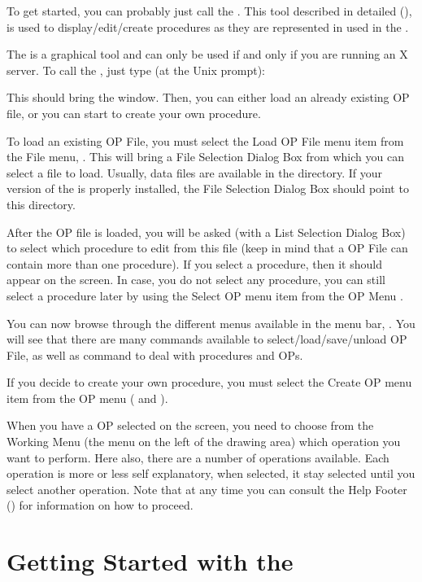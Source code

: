 To get started, you can probably just call the \OPE{}. This tool described in
detailed (), is used to display/edit/create
procedures as they are represented in used in the \COPRSDE{}.

The \OPE{} is a graphical tool and can only be used if and only if you are
running an X server. To call the \OPE{}, just type (at the Unix prompt):


This should bring the \OPE{} window. Then, you can either load an already
existing OP file, or you can start to create your own procedure.

To load an existing OP File, you must select the Load OP File menu item
from the File menu, . This will bring a File Selection
Dialog Box from which you can select a file to load. Usually, data files
are available in the  directory. If your version
of the \OPE{} is properly installed, the File Selection Dialog Box should
point to this directory.

After the OP file is loaded, you will be asked (with a List Selection
Dialog Box) to select which procedure to edit from this file (keep in mind
that a OP File can contain more than one procedure). If you select a
procedure, then it should appear on the screen. In case, you do not select
any procedure, you can still select a procedure later by using the Select
OP menu item from the OP Menu .

You can now browse through the different menus available in the menu bar,
. You will see that there are many
commands available to select/load/save/unload OP File, as well as command
to
deal with procedures and OPs.

If you decide to create your own procedure, you must select the Create OP
menu item from the OP menu ( and ).

When you have a OP selected on the screen, you need to choose from the
Working Menu (the menu on the left of the drawing area) which operation
you want to perform. Here also, there are a number of operations
available. Each operation is more or less self explanatory, when
selected, it stay selected until you select another operation. Note that
at any time you can consult the Help Footer () for information on how to proceed.

\section{Getting Started with the \XPK{}}

